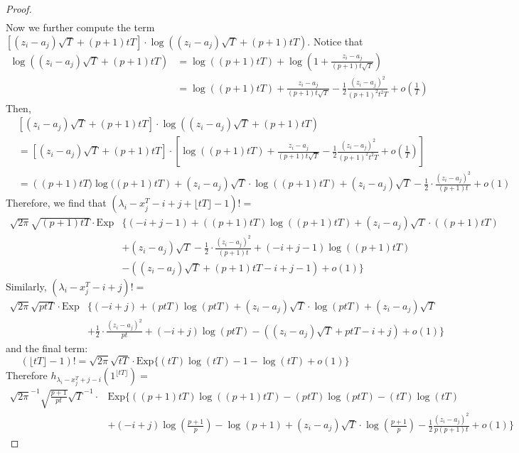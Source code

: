 \begin{proof}
\begin{align*}
\end{align*}
Now we further compute the term $\left[(z_{i}-a_{j})\sqrt{T}+(p+1)tT\right]\cdot \log\left((z_{i}-a_{j})\sqrt{T}+(p+1)tT\right)$. Notice that
\begin{align*}
	\log\left((z_{i}-a_{j})\sqrt{T}+(p+1)tT\right)&= \log\left((p+1)tT\right)+\log\left(1+\frac{z_{i}-a_{j}}{(p+1)t\sqrt{T}}\right)\\
	&= \log((p+1)tT)+\frac{z_{i}-a_{j}}{(p+1)t\sqrt{T}}-\frac{1}{2}\frac{(z_{i}-a_{j})^2}{(p+1)^{2}t^{2}T}+o(\frac{1}{T})
\end{align*}
Then, 
\begin{align*}
	& \left[(z_{i}-a_{j})\sqrt{T}+(p+1)tT\right]\cdot \log\left((z_{i}-a_{j})\sqrt{T}+(p+1)tT\right)\\
	&=\left[(z_{i}-a_{j})\sqrt{T}+(p+1)tT\right]\cdot \left[\log((p+1)tT)+\frac{z_{i}-a_{j}}{(p+1)t\sqrt{T}}-\frac{1}{2}\frac{(z_{i}-a_{j})^2}{(p+1)^{2}t^{2}T}+o(\frac{1}{T})\right]\\
	&=\left((p+1)tT)\log((p+1)tT\right)+(z_{i}-a_{j})\sqrt{T}\cdot \log((p+1)tT)+(z_{i}-a_{j})\sqrt{T}-\frac{1}{2}\cdot\frac{(z_{i}-a_{j})^2}{(p+1)t}+o(1)
\end{align*}
Therefore, we find that $(\lambda_{i}-x_{j}^{T}-i+j+\lfloor tT \rfloor -1)!=$
\begin{align*}
	\sqrt{2\pi}\sqrt{(p+1)tT}\cdot \text{Exp}&\{(-i+j-1) + ((p+1)tT)\log((p+1)tT)+(z_{i}-a_{j})\sqrt{T}\cdot ((p+1)tT)\\
	&+(z_{i}-a_{j})\sqrt{T}-\frac{1}{2}\cdot\frac{(z_{i}-a_{j})^2}{(p+1)t}+(-i+j-1)\log((p+1)tT)\\&-\left((z_{i}-a_{j})\sqrt{T} + (p+1)tT-i+j-1\right)+o(1)\}
\end{align*}
Similarly, $(\lambda_{i}-x_{j}^{T}-i+j)!=$
\begin{align*}
\sqrt{2\pi}\sqrt{ptT}\cdot \text{Exp}&\{(-i+j) + (ptT)\log(ptT)+(z_{i}-a_{j})\sqrt{T}\cdot \log(ptT)+(z_{i}-a_{j})\sqrt{T}\\
& +\frac{1}{2}\cdot\frac{(z_{i}-a_{j})^2}{pt}+(-i+j)\log(ptT)-((z_{i}-a_{j})\sqrt{T} + ptT-i+j)+o(1)\}
\end{align*} and the final term: $$
(\lfloor tT \rfloor-1)!= \sqrt{2\pi}\sqrt{tT}\cdot \text{Exp}\{(tT)\log(tT)-1-\log(tT)+o(1)\}$$
Therefore $h_{\lambda_{i}-x^{T}_{j}+j-i}(1^{\lfloor tT \rfloor})=$
\begin{align*}
	\sqrt{2\pi}^{-1}\sqrt{\frac{p+1}{pt}}\sqrt{T}^{-1}\cdot &\text{Exp}\bigg\{((p+1)tT)\log((p+1)tT)-(ptT)\log(ptT)-(tT)\log(tT)\\
	& +(-i+j)\log(\frac{p+1}{p})-\log(p+1)+(z_{i}-a_{j})\sqrt{T}\cdot \log(\frac{p+1}{p})-\frac{1}{2}\frac{(z_{i}-a_{j})^{2}}{p(p+1)t}+o(1)\bigg\}

\end{align*}
\end{proof}
